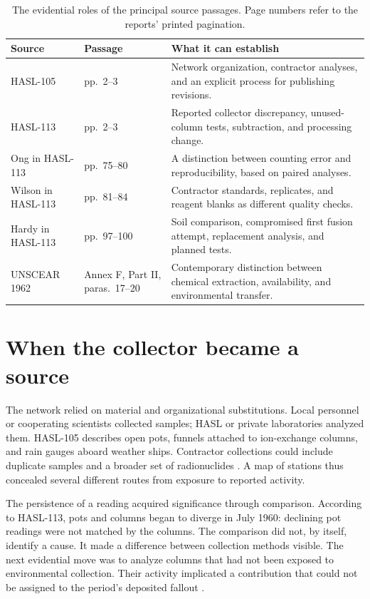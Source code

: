 \documentclass[11pt,a4paper]{article}
\begin{document}
\begin{table}[t]
\centering\small
\caption{The evidential roles of the principal source passages. Page numbers refer to the reports' printed pagination.}
\begin{tabular}{p{.19\linewidth}p{.24\linewidth}p{.47\linewidth}}
\toprule
Source & Passage & What it can establish\\\midrule
HASL-105 & pp.~2--3 & Network organization, contractor analyses, and an explicit process for publishing revisions.\\
HASL-113 & pp.~2--3 & Reported collector discrepancy, unused-column tests, subtraction, and processing change.\\
Ong in HASL-113 & pp.~75--80 & A distinction between counting error and reproducibility, based on paired analyses.\\
Wilson in HASL-113 & pp.~81--84 & Contractor standards, replicates, and reagent blanks as different quality checks.\\
Hardy in HASL-113 & pp.~97--100 & Soil comparison, compromised first fusion attempt, replacement analysis, and planned tests.\\
UNSCEAR 1962 & Annex F, Part II, paras.~17--20 & Contemporary distinction between chemical extraction, availability, and environmental transfer.\\\bottomrule
\end{tabular}
\label{tab:sources}
\end{table}

\section{When the collector became a source}
The network relied on material and organizational substitutions. Local personnel or cooperating scientists collected samples; HASL or private laboratories analyzed them. HASL-105 describes open pots, funnels attached to ion-exchange columns, and rain gauges aboard weather ships. Contractor collections could include duplicate samples and a broader set of radionuclides \citep[p.~2]{hasl105}. A map of stations thus concealed several different routes from exposure to reported activity.

The persistence of a reading acquired significance through comparison. According to HASL-113, pots and columns began to diverge in July 1960: declining pot readings were not matched by the columns. The comparison did not, by itself, identify a cause. It made a difference between collection methods visible. The next evidential move was to analyze columns that had not been exposed to environmental collection. Their activity implicated a contribution that could not be assigned to the period's deposited fallout \citep[pp.~2--3]{hasl113}.
\end{document}
